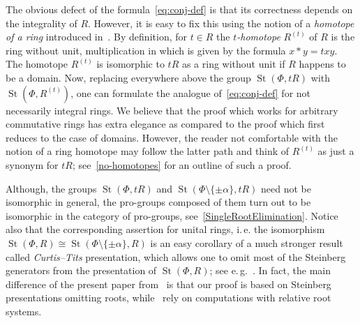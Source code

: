 \documentclass[oneside, 11pt]{amsart}
\numberwithin{equation}{section}
\theoremstyle{definition}
\theoremstyle{remark}
\DeclareMathOperator\St{St}
\begin{document}
The obvious defect of the formula~\eqref{eq:conj-def} is that its correctness depends on the integrality of $R$.
However, it is easy to fix this using the notion of a {\it homotope of a ring} introduced in~\cite{Vor1,Vor2}. By definition, for $t \in R$ the {\it $t$-homotope} $R^{(t)}$ of $R$ is the ring without unit, multiplication in which is given by the formula $x*y=txy$. The homotope $R^{(t)}$ is isomorphic to $tR$ as a ring without unit if $R$ happens to be a domain. 
Now, replacing everywhere above the group $\St(\Phi, tR)$ with $\St(\Phi, R^{(t)})$, one can formulate the analogue of~\eqref{eq:conj-def} for not necessarily integral rings.
We believe that the proof which works for arbitrary commutative rings has extra elegance as compared to the proof which first reduces to the case of domains. However, the reader not comfortable with the notion of a ring homotope may follow the latter path and think of $R^{(t)}$ as just a synonym for $tR$; see~\cref{no-homotopes} for an outline of such a proof.

Although, the groups $\St(\Phi, tR)$ and $\St(\Phi\setminus\{\pm \alpha\}, tR)$ need not be isomorphic in general, the pro-groups composed of them turn out to be isomorphic in the category of pro-groups, see~\cref{SingleRootElimination}. Notice also that the corresponding assertion for unital rings, i.\,e. the isomorphism $\St(\Phi, R) \cong \St(\Phi\setminus\{\pm\alpha\}, R)$ is an easy corollary of a much stronger result called {\it Curtis--Tits} presentation, which allows one to omit most of the Steinberg generators from the presentation of $\St(\Phi, R)$; see e.\,g.~\cite[Corollary~1.3]{A13}. In fact, the main difference of the present paper from~\cite{Vor1, Vor2} is that our proof is based on Steinberg presentations omitting roots, while~\cite{Vor1, Vor2} rely on computations with relative root systems. 
\end{document}
